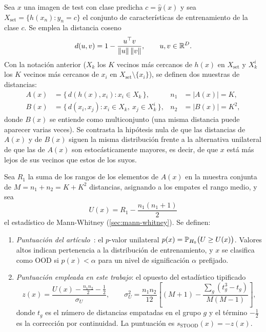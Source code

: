 \begin{definicion}\label{def:stoodx}
Sea $x$ una imagen de test con clase predicha $c = \hat y(x)$ y sea
$X_{\mathrm{set}} = \{h(x_n) : y_n = c\}$ el conjunto de características de entrenamiento de
la clase $c$. Se emplea la distancia coseno
\begin{equation}
  d(u, v) = 1 - \frac{u^{\top} v}{\lVert u \rVert \, \lVert v \rVert}, \qquad u, v \in \mathbb{R}^D .
\end{equation}
Con la notación anterior ($X_k$ los $K$ vecinos más cercanos de $h(x)$ en $X_{\mathrm{set}}$ y
$X_k^{i}$ los $K$ vecinos más cercanos de $x_i$ en $X_{\mathrm{set}} \setminus \{x_i\}$), se
definen dos muestras de distancias:
\begin{align}
  A(x) &= \bigl\{\, d(h(x), x_i) : x_i \in X_k \,\bigr\},
       & n_1 &= |A(x)| = K, \\
  B(x) &= \bigl\{\, d(x_i, x_j) : x_i \in X_k,\ x_j \in X_k^{i} \,\bigr\},
       & n_2 &= |B(x)| = K^2,
\end{align}
donde $B(x)$ se entiende como multiconjunto (una misma distancia puede aparecer varias veces).
Se contrasta la hipótesis nula de que las distancias de $A(x)$ y de $B(x)$ siguen la misma
distribución frente a la alternativa unilateral de que las de $A(x)$ son estocásticamente
mayores, es decir, de que $x$ está más lejos de sus vecinos que estos de los suyos.

Sea $R_1$ la suma de los rangos de los elementos de $A(x)$ en la muestra conjunta de
$M = n_1 + n_2 = K + K^2$ distancias, asignando a los empates el rango medio, y sea
\begin{equation}
  U(x) = R_1 - \frac{n_1 (n_1 + 1)}{2}
\end{equation}
el estadístico de Mann-Whitney (\cref{sec:mann-whitney}). Se definen:
\begin{enumerate}
  \item \emph{Puntuación del artículo}~\cite{sevillano2026}: el $p$-valor unilateral
        $p(x) = \mathbb{P}_{H_0}\bigl(U \geq U(x)\bigr)$. Valores altos indican pertenencia a la
        distribución de entrenamiento, y $x$ se clasifica como OOD si $p(x) < \alpha$ para un
        nivel de significación $\alpha$ prefijado.
  \item \emph{Puntuación empleada en este trabajo}: el opuesto del estadístico tipificado
        \begin{equation}
          z(x) = \frac{U(x) - \frac{n_1 n_2}{2} - \frac12}{\sigma_U},
          \qquad
          \sigma_U^2 = \frac{n_1 n_2}{12}
          \left[ (M + 1) - \frac{\sum_{g} (t_g^3 - t_g)}{M (M - 1)} \right],
        \end{equation}
        donde $t_g$ es el número de distancias empatadas en el grupo $g$ y el término $-\frac12$
        es la corrección por continuidad. La puntuación es $s_{\mathrm{STOOD}}(x) = -z(x)$.
\end{enumerate}
\end{definicion}

